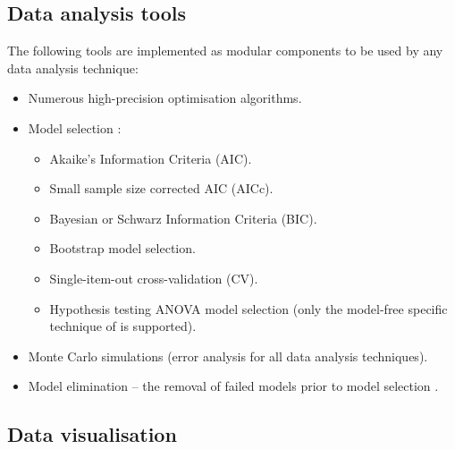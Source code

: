 
\subsection{Data analysis tools}

The following tools are implemented as modular components to be used by any data analysis technique:
\begin{itemize}
  \item Numerous high-precision optimisation algorithms.
  \item Model selection \citep{dAuvergneGooley03, Chen04}:
  \begin{itemize}
    \item Akaike's Information Criteria (AIC).
    \item Small sample size corrected AIC (AICc).
    \item Bayesian or Schwarz Information Criteria (BIC).
    \item Bootstrap model selection.
    \item Single-item-out cross-validation (CV).
    \item Hypothesis testing ANOVA model selection (only the model-free specific technique of \citet{Mandel95} is supported).
  \end{itemize}
  \item Monte Carlo simulations (error analysis for all data analysis techniques).
  \item Model elimination -- the removal of failed models prior to model selection \citep{dAuvergneGooley06}.
\end{itemize}



\subsection{Data visualisation}

